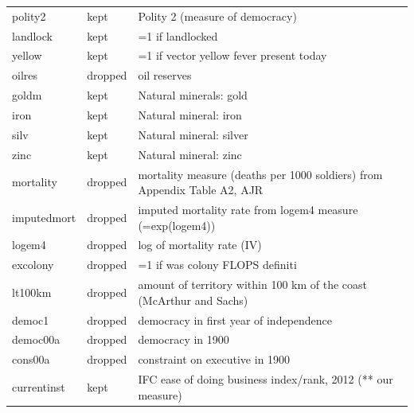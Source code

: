 \begin{tabular}{lll}
 polity2                        & kept     & Polity 2 (measure of democracy)                                          \\
 landlock                       & kept     & =1 if landlocked                                                         \\
 yellow                         & kept     & =1 if vector yellow fever present today                                  \\
 oilres                         & dropped  & oil reserves                                                             \\
 goldm                          & kept     & Natural minerals: gold                                                   \\
 iron                           & kept     & Natural mineral: iron                                                    \\
 silv                           & kept     & Natural mineral: silver                                                  \\
 zinc                           & kept     & Natural mineral: zinc                                                    \\
 mortality                      & dropped  & mortality measure (deaths per 1000 soldiers) from Appendix Table A2, AJR \\
 imputedmort                    & dropped  & imputed mortality rate from logem4 measure (=exp(logem4))                \\
 logem4                         & dropped  & log of mortality rate (IV)                                               \\
 excolony                       & dropped  & =1 if was colony FLOPS definiti                                          \\
 lt100km                        & dropped  & amount of territory within 100 km of the coast (McArthur and Sachs)      \\
 democ1                         & dropped  & democracy in first year of independence                                  \\
 democ00a                       & dropped  & democracy in 1900                                                        \\
 cons00a                        & dropped  & constraint on executive in 1900                                          \\
 currentinst                    & kept     & IFC ease of doing business index/rank, 2012 (** our measure)             \\

\end{tabular}
